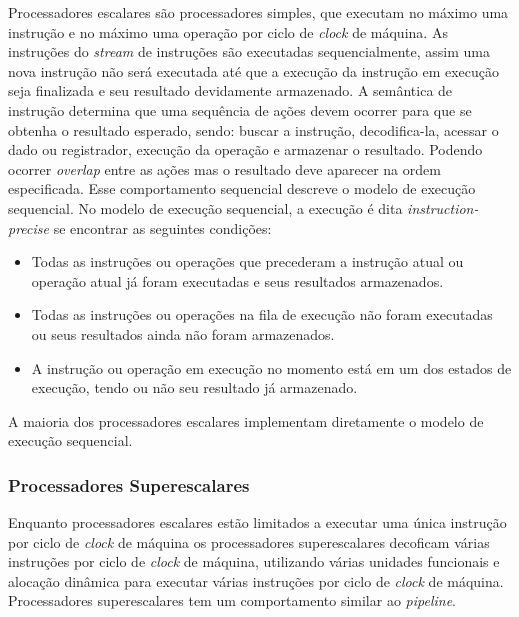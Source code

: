 Processadores escalares são processadores simples, que executam no 
máximo uma instrução e no máximo uma operação por ciclo de \textit{clock} de 
máquina. 
As instruções do \textit{stream} de instruções são executadas 
sequencialmente, assim uma nova instrução não será executada até que a execução 
da instrução em execução seja finalizada e seu resultado devidamente
armazenado.
A semântica de instrução determina que uma sequência de ações devem ocorrer
para que se obtenha o resultado esperado, sendo: buscar a instrução,
decodifica-la, acessar o dado ou registrador, execução da operação e armazenar o
resultado. 
Podendo ocorrer \textit{overlap} entre as ações mas o resultado deve
aparecer na ordem especificada.
Esse comportamento sequencial descreve o modelo de execução sequencial.
No modelo de execução sequencial, a execução é dita \textit{instruction-precise}
se encontrar as seguintes condições:

\begin{itemize}
        \item Todas as instruções ou operações que precederam a instrução atual
                ou operação atual já foram executadas e seus resultados
                armazenados.
        \item Todas as instruções ou operações na fila de execução não foram
                executadas ou seus resultados ainda não foram armazenados.
        \item A instrução ou operação em execução no momento está em um dos
                estados de execução, tendo ou não seu resultado já armazenado.
\end{itemize}

A maioria dos processadores escalares implementam diretamente o modelo de
execução sequencial.


\subsubsection{Processadores Superescalares}

Enquanto processadores escalares estão limitados a executar uma única instrução 
por ciclo de \textit{clock} de máquina os processadores superescalares decoficam
várias instruções por ciclo de \textit{clock} de máquina, utilizando várias
unidades funcionais e alocação dinâmica para executar várias instruções por
ciclo de \textit{clock} de máquina. 
Processadores superescalares tem um comportamento similar ao \textit{pipeline}.

